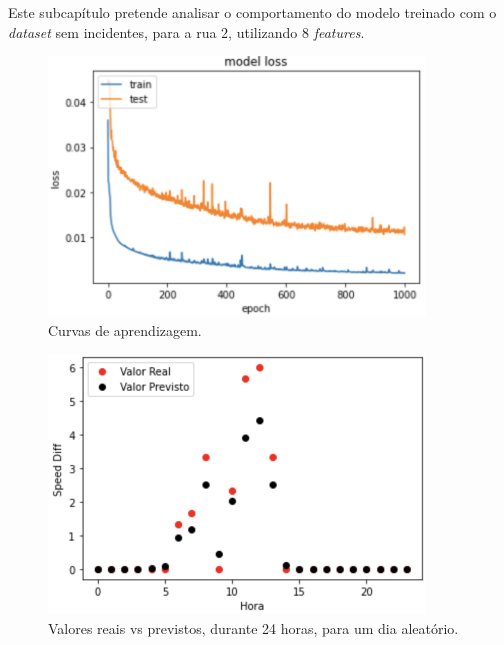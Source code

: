 \documentclass[a4paper, 12pt]{article}
\begin{document}
Este subcapítulo pretende analisar o comportamento do modelo treinado com o \textit{dataset} sem incidentes, para a rua $2$, utilizando $8$ \textit{features}.

\begin{figure}[H]
	\centering
	\includegraphics[width=10cm]{resultados/aprend_no_inc.png}
	\caption{Curvas de aprendizagem.}
\end{figure}

\begin{figure}[H]
	\centering
	\includegraphics[width=10cm]{resultados/prev_real_no_inc.png}
	\caption{Valores reais vs previstos, durante 24 horas, para um dia aleatório.}
\end{figure}
\end{document}
